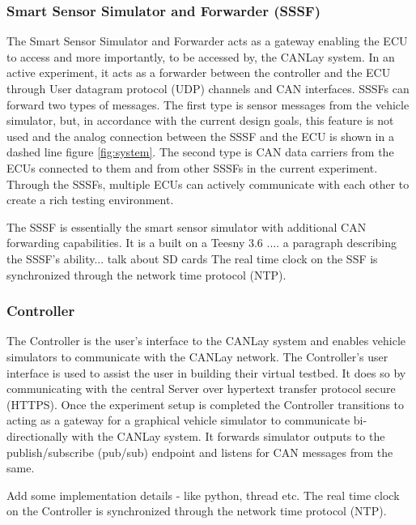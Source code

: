 \documentclass[letterpaper,twocolumn,12pt]{article}
\begin{document}
\subsubsection{Smart Sensor Simulator and Forwarder (SSSF)}
The Smart Sensor Simulator and Forwarder acts as a gateway enabling the ECU to access and more importantly, to be accessed by, the CANLay system. In an active experiment, it acts as a forwarder between the controller and the ECU through User datagram protocol (UDP) channels and CAN interfaces. SSSFs can forward two types of messages. The first type is sensor messages from the vehicle simulator, but, in accordance with the current design goals, this feature is not used and the analog connection between the SSSF and the ECU is shown in a dashed line figure \ref{fig:system}.  
The second type is CAN data carriers from the ECUs connected to them and from other SSSFs in the current experiment. Through the SSSFs, multiple ECUs can actively communicate with each other to create a rich testing environment.

The SSSF is essentially the smart sensor simulator with additional CAN forwarding capabilities. It is a built on a Teesny 3.6 .... a paragraph describing the SSSF's ability...
talk about SD cards
The real time clock on the SSF is synchronized through the network time protocol (NTP).

\subsubsection{Controller}
The Controller is the user's interface to the CANLay system and enables vehicle simulators to communicate with the CANLay network. The Controller’s user interface is used to assist the user in building their virtual testbed. 
It does so by communicating with the central Server over hypertext transfer protocol secure (HTTPS). 
Once the experiment setup is completed the Controller transitions to acting as a gateway for a graphical vehicle simulator to communicate bi-directionally with the CANLay system. It forwards simulator outputs to the publish/subscribe (pub/sub) endpoint and listens for CAN messages from the same.

Add some implementation details - like python, thread etc.
The real time clock on the Controller is synchronized through the network time protocol (NTP).
\end{document}
